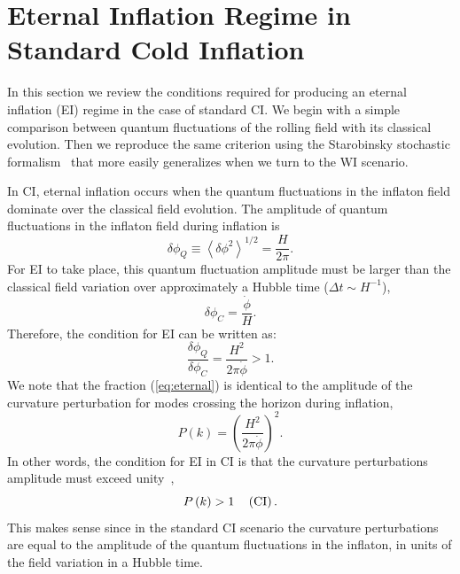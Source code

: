 \documentclass[a4paper,11pt]{article}
\begin{document}
\section{Eternal Inflation Regime in Standard Cold Inflation }
\label{EICI}

In this section we review the conditions required for producing an eternal inflation (EI) regime in the case of standard CI. We begin with a simple comparison between quantum fluctuations of the rolling field with its classical evolution. Then we reproduce the same criterion using the Starobinsky stochastic formalism~\cite{Starobinsky:1986fx} that more easily generalizes when we turn to the WI scenario.

In CI, eternal inflation occurs when the quantum fluctuations in the inflaton field dominate over the classical field evolution.  The amplitude of quantum fluctuations in the inflaton field during inflation is
\begin{equation}
\delta\phi_Q \equiv \left\langle \delta \phi^2\right\rangle^{1/2} = \frac{H}{2 \pi}.
\end{equation}
For EI to take place, this quantum fluctuation amplitude must be larger than the classical field variation over approximately a Hubble time ($\Delta t\sim
H^{-1}$),
\begin{equation}
\delta\phi_C = \frac{\dot\phi}{H}.
\end{equation}
Therefore, the condition for EI can be written as:
\begin{equation}
\frac{\delta\phi_Q}{\delta\phi_C} = \frac{H^2}{2 \pi \dot\phi} > 1.\label{eq:eternal}
\end{equation}
We note that the fraction (\ref{eq:eternal}) is identical to the amplitude of the curvature perturbation for modes crossing the horizon during inflation,
\begin{equation}
P\left(k\right) =\left(\frac{H^2}{2\pi\dot{\phi}}\right)^2. \label{eq:DeltaR2_CI}
\end{equation}
In other words, the condition for EI in CI is that the curvature perturbations amplitude must
exceed unity~\cite{Goncharov:1987ir,Guth:2007ng,Kinney:2014jya},
\begin{equation}
\label{eq:FDR_CI}
P\left(k\right) > 1 \,\,\,\,\,\,\,   ({\rm 
 CI}) \, .
\end{equation}
This makes sense since in the standard CI scenario the
curvature perturbations are equal to the amplitude of the quantum fluctuations in the inflaton,
in units of the field variation in a Hubble time.
\end{document}
